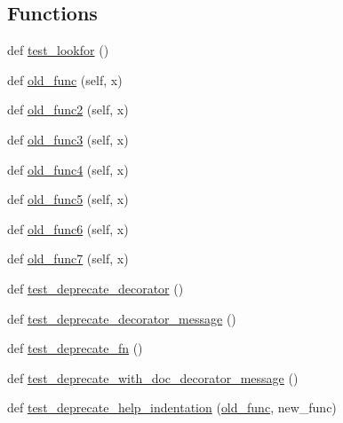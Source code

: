 \subsection*{Functions}
\begin{DoxyCompactItemize}
\item 
def \hyperlink{namespacenumpy_1_1lib_1_1tests_1_1test__utils_abec9d265e7e3bbb0a831843e594d3499}{test\+\_\+lookfor} ()
\item 
def \hyperlink{namespacenumpy_1_1lib_1_1tests_1_1test__utils_a52a19c1fdd29388c5846632d79930791}{old\+\_\+func} (self, x)
\item 
def \hyperlink{namespacenumpy_1_1lib_1_1tests_1_1test__utils_abd0efc75409e62a2a062ea71d0ef5727}{old\+\_\+func2} (self, x)
\item 
def \hyperlink{namespacenumpy_1_1lib_1_1tests_1_1test__utils_a89044e7dea9f11e62c76cd93456bdae4}{old\+\_\+func3} (self, x)
\item 
def \hyperlink{namespacenumpy_1_1lib_1_1tests_1_1test__utils_af259dcbb2a8f9387ab6c7419fbfff7a8}{old\+\_\+func4} (self, x)
\item 
def \hyperlink{namespacenumpy_1_1lib_1_1tests_1_1test__utils_ab7b5cefe076620bf10065e24bb9e6756}{old\+\_\+func5} (self, x)
\item 
def \hyperlink{namespacenumpy_1_1lib_1_1tests_1_1test__utils_a73c7dd823cb6bbb1b5c483643ce1c1f4}{old\+\_\+func6} (self, x)
\item 
def \hyperlink{namespacenumpy_1_1lib_1_1tests_1_1test__utils_a0d303f9f4b4abed1ae14c33599eaa8d8}{old\+\_\+func7} (self, x)
\item 
def \hyperlink{namespacenumpy_1_1lib_1_1tests_1_1test__utils_a0901e1b763adf96602ccb7343e6e7d9d}{test\+\_\+deprecate\+\_\+decorator} ()
\item 
def \hyperlink{namespacenumpy_1_1lib_1_1tests_1_1test__utils_a8805f29814c062a9d86c8e55a6d8152d}{test\+\_\+deprecate\+\_\+decorator\+\_\+message} ()
\item 
def \hyperlink{namespacenumpy_1_1lib_1_1tests_1_1test__utils_a398cab024ad9ebae5395d349677ff9d2}{test\+\_\+deprecate\+\_\+fn} ()
\item 
def \hyperlink{namespacenumpy_1_1lib_1_1tests_1_1test__utils_a606fd8fcdba20e9eb76057982fad2d32}{test\+\_\+deprecate\+\_\+with\+\_\+doc\+\_\+decorator\+\_\+message} ()
\item 
def \hyperlink{namespacenumpy_1_1lib_1_1tests_1_1test__utils_a6e268beb1267f3d82863d3fdddd9b75c}{test\+\_\+deprecate\+\_\+help\+\_\+indentation} (\hyperlink{namespacenumpy_1_1lib_1_1tests_1_1test__utils_a52a19c1fdd29388c5846632d79930791}{old\+\_\+func}, new\+\_\+func)

\end{DoxyCompactItemize}
